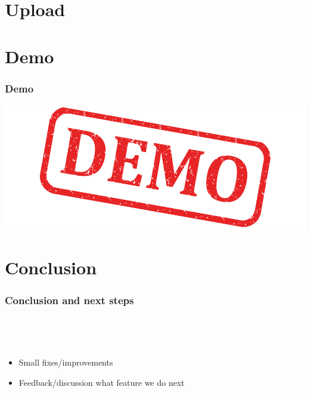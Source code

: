 \section{Upload}

\section{Demo}

\begin{frame}
  \frametitle{Demo}
  \includegraphics[width=\textwidth]{images/demo}
\end{frame}

\section{Conclusion}

\begin{frame}
  \frametitle{Conclusion and next steps}
  \begin{description}[]
    \item[Conclusion] \hfill \\
    \begin{block}{}
    \end{block}
    \item[Next Steps] \hfill \\
      \begin{itemize}
        \item Small fixes/improvements
        \item Feedback/discussion what feature we do next
      \end{itemize}
  \end{description} 
\end{frame}

